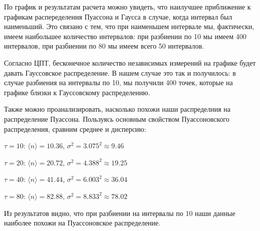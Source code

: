 \documentclass[12pt]{extarticle}
\begin{document}
По график и результатам расчета можно увидеть, что наилучшее приближение к графикам
распеределения Пуассона и Гаусса в случае, когда интервал был наименьший. Это связано 
с тем, что при наименьшем интервале мы, фактически, имеем наибольшее количество интервалов:
при разбиении по 10 мы имеем 400 интервалов, при разбиении по 80 мы имеем всего 50 интервалов. 

Согласно ЦПТ, бесконечное количество независимых измерений на графике будет давать 
Гауссовское распределение. В нашем случае это так и получилось: в случае разбиения на интервалы по 10,
мы получили 400 точек, которые на графике близки к Гауссовскому распределению.

Также можно проанализировать, насколько похожи наши распределния на распределение Пуассона.
Пользуясь основным свойством Пуассоновского распределения, сравним среднее и дисперсию:

$\tau = 10$: $\langle n \rangle = 10.36$, $\sigma^2 = 3.075^2 \approx 9.46$

$\tau = 20$: $\langle n \rangle = 20.72$, $\sigma^2 = 4.388^2 \approx 19.25$

$\tau = 40$: $\langle n \rangle = 41.44$, $\sigma^2 = 6.003^2 \approx 36.04$

$\tau = 80$: $\langle n \rangle = 82.88$, $\sigma^2 = 8.833^2 \approx 78.02$

Из результатов видно, что при разбиении на интервалы по 10 наши данные наиболее похожи
на Пуассоновское распределение.
\end{document}
